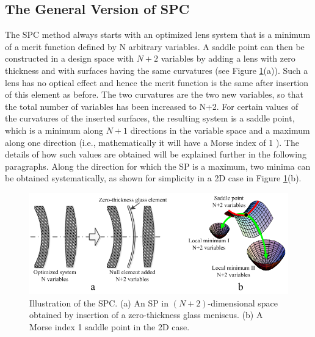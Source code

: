 \subsection{The General Version of SPC \label{spc-general}}
\label{SPC_general}
The SPC method always starts with an optimized lens system that is a minimum of a merit function defined by N arbitrary variables. A saddle point can then be constructed in a design space with $N + 2$ variables by adding a lens with zero thickness and with surfaces having the same curvatures (see Figure \ref{fig:SPCdemo}(a)). Such a lens has no optical effect and hence the merit function is the same after insertion of this element as before. The two curvatures are the two new variables, so that the total number of variables has been increased to N+2. For certain values of the curvatures of the inserted surfaces, the resulting system is a saddle point, which is a minimum along $N + 1$ directions in the variable space and a maximum along one direction (i.e., mathematically it will have a Morse index of 1 \cite{MVTurnhoutSPC15}). The details of how such values are obtained will be explained further in the following paragraphs. Along the direction for which the SP is a maximum, two minima can be obtained systematically, as shown for simplicity in a 2D case in Figure \ref{fig:SPCdemo}(b).

\begin{figure}[h!]
    \centering
    \includegraphics[scale=0.68]{chapter-2/figures/FigSPCDemo.png}
    \caption{Illustration of the SPC. (a) An SP in $(N+2)$-dimensional space obtained by insertion of a zero-thickness glass meniscus. (b) A Morse index 1 saddle point in the 2D case.}
    \label{fig:SPCdemo}
\end{figure}

